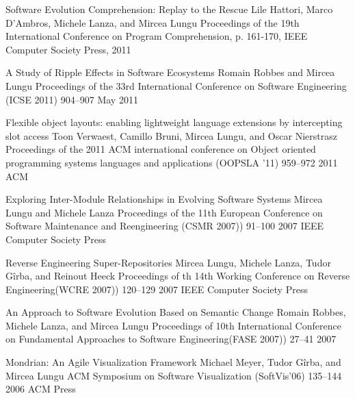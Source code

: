 \begin{enumerate}


\densepaper
	{Software Evolution Comprehension: Replay to the Rescue}
	{Lile Hattori, Marco D'Ambros, Michele Lanza, and Mircea Lungu}
	{Proceedings of the 19th International Conference on Program Comprehension, p. 161-170, IEEE Computer Society Press, 2011}

\densepap
	{A Study of Ripple Effects in Software Ecosystems}
	{Romain Robbes and Mircea Lungu}
	{Proceedings of the 33rd International Conference on Software Engineering (ICSE 2011)}
	{904--907}
	{May 2011}
	{}


\densepap
	{Flexible object layouts: enabling lightweight language extensions by intercepting slot access}
	{Toon Verwaest, Camillo Bruni, Mircea Lungu, and Oscar Nierstrasz}
	{Proceedings of the 2011 ACM international conference on Object oriented programming systems languages and applications (OOPSLA '11)}
	{959--972}
	{2011}
	{ACM}




\densepap
	{Exploring Inter-Module Relationships in Evolving Software Systems}
	{Mircea Lungu and Michele Lanza}
	{Proceedings of the 11th European Conference on Software Maintenance and Reengineering (CSMR 2007))}
	{91--100}
	{2007}
	{IEEE Computer Society Press}

\densepap
	{Reverse Engineering Super-Repositories}
	{Mircea Lungu, Michele Lanza, Tudor G\^irba, and Reinout Heeck}
	{Proceedings of th 14th Working Conference on Reverse Engineering(WCRE 2007))}
	{120--129}
	{2007}
	{IEEE Computer Society Press}

\densepap
	{An Approach to Software Evolution Based on Semantic Change}
	{Romain Robbes, Michele Lanza, and Mircea Lungu}
	{Proceedings of 10th International Conference on Fundamental Approaches to Software Engineering(FASE 2007))}
	{27--41}
	{2007}
	{}


\densepap
	{Mondrian: An Agile Visualization Framework}
	{Michael Meyer, Tudor G\^irba, and Mircea Lungu}
	{ACM Symposium on Software Visualization (SoftVis'06)}
	{135--144}
	{2006}
	{ACM Press}

\end{enumerate}